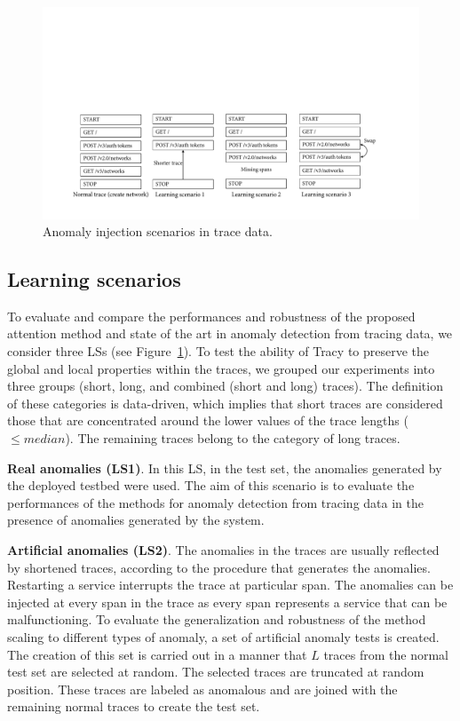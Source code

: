 \begin{figure}[htbp]
\centering
\includegraphics[width=1.0\textwidth]{gfx/chap7/traceanomalyinjections.pdf}
\caption{Anomaly injection scenarios in trace data.}
\label{fig:traceanomalyinjections}
\end{figure}


\subsection{Learning scenarios}
To evaluate and compare the performances and robustness of the proposed attention method and state of the art in anomaly detection from tracing data, we consider three LSs (see Figure~\ref{fig:traceanomalyinjections}). To test the ability of Tracy to preserve the global and local properties within the traces, we grouped our experiments into three groups (short, long, and combined (short and long) traces). The definition of these categories is data-driven, which implies that short traces are considered those that are concentrated around the lower values of the trace lengths ($\leq median$). The remaining traces belong to the category of long traces. 

\textbf{Real anomalies (LS1)}. In this LS, in the test set, the anomalies generated by the deployed testbed were used. The aim of this scenario is to evaluate the performances of the methods for anomaly detection from tracing data in the presence of anomalies generated by the system.

\textbf{Artificial anomalies (LS2)}. The anomalies in the traces are usually reflected by shortened traces, according to the procedure that generates the anomalies. Restarting a service interrupts the trace at particular span. The anomalies can be injected at every span in the trace as every span represents a service that can be malfunctioning. To evaluate the generalization and robustness of the method scaling to different types of anomaly, a set of artificial anomaly tests is created. The creation of this set is carried out in a manner that $L$ traces from the normal test set are selected at random. The selected traces are truncated at random position. These traces are labeled as anomalous and are joined with the remaining normal traces to create the test set.  


